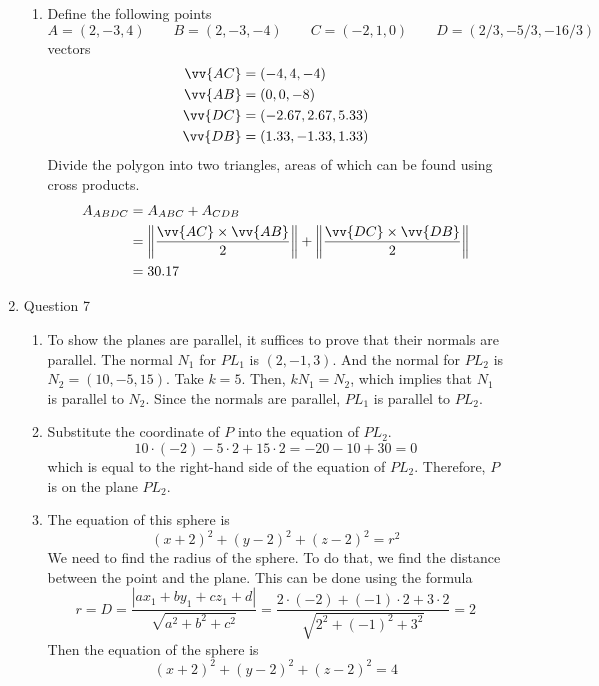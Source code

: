 \documentclass[11pt]{article}
\begin{document}
\begin{enumerate}
\begin{enumerate}
        \item
        Define the following points
        $$
        A=(2,-3,4) \qquad B=(2,-3,-4) \qquad C=(-2,1,0) \qquad D=(2/3,-5/3,-16/3)
        $$
        vectors
        \begin{align*}
            \vv{AC} &= (-4,4,-4)\\
            \vv{AB} &= (0,0,-8)\\
            \vv{DC} &= (-2.67,2.67,5.33)\\
            \vv{DB} &= (1.33,-1.33,1.33)\\
        \end{align*}
        Divide the polygon into two triangles, areas of which can be found using cross products.
        \begin{align*}
            A_{ABDC} &= A_{ABC} + A_{CDB} \\
            &= \left\lVert \frac{\vv{AC} \times \vv{AB}}{2} \right\rVert + \left\lVert \frac{\vv{DC} \times \vv{DB}}{2} \right\rVert \\
            &= 30.17
        \end{align*}
    \end{enumerate}
    
    \item Question 7
    \begin{enumerate}
        \item To show the planes are parallel, it suffices to prove that their normals are parallel. The normal $N_1$ for $PL_1$ is $(2,-1,3)$. And the normal for $PL_2$ is $N_2 = (10,-5,15)$. Take $k=5$. Then, $kN_1=N_2$, which implies that $N_1$ is parallel to $N_2$. Since the normals are parallel, $PL_1$ is parallel to $PL_2$.
        
        \item Substitute the coordinate of $P$ into the equation of $PL_2$.
        $$
        10\cdot (-2) -5 \cdot 2 + 15 \cdot 2 = -20-10+30 = 0
        $$
        which is equal to the right-hand side of the equation of $PL_2$. Therefore, $P$ is on the plane $PL_2$.
        
        \item The equation of this sphere is
        $$
        (x+2)^2 + (y-2)^2 + (z-2)^2 = r^2
        $$
        We need to find the radius of the sphere. To do that, we find the distance between the point and the plane. This can be done using the formula
        $$
        r=D=\frac{|ax_1+by_1+cz_1+d|}{\sqrt{a^2+b^2+c^2}} = \frac{2\cdot (-2) + (-1)\cdot2 + 3\cdot2}{\sqrt{2^2 + (-1)^2 + 3^2}} = 2
        $$
        Then the equation of the sphere is
        $$
        (x+2)^2 + (y-2)^2 + (z-2)^2 = 4
        $$
    \end{enumerate}
    

\end{enumerate}
\end{document}
